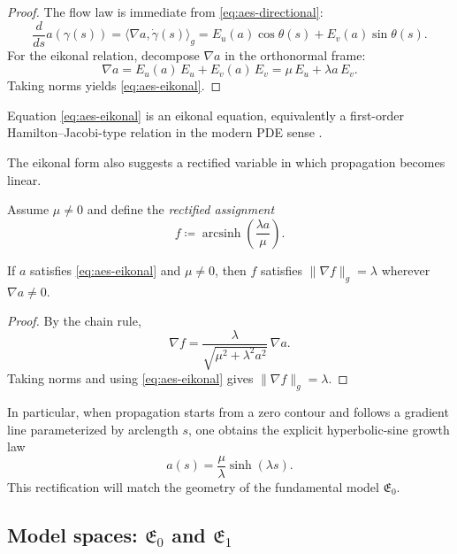 \begin{proof}
The flow law is immediate from \eqref{eq:aes-directional}:
\[
\frac{d}{ds}a(\gamma(s))=\langle \nabla a,\dot\gamma(s)\rangle_g=E_u(a)\cos\theta(s)+E_v(a)\sin\theta(s).
\]
For the eikonal relation, decompose $\nabla a$ in the orthonormal frame:
\[
\nabla a=E_u(a)\,E_u+E_v(a)\,E_v=\mu\,E_u+\lambda a\,E_v.
\]
Taking norms yields \eqref{eq:aes-eikonal}.
\end{proof}

Equation \eqref{eq:aes-eikonal} is an eikonal equation, equivalently a first-order Hamilton--Jacobi-type relation in the modern PDE sense \cite{Hamilton1834GeneralMethod,Evans2010PDE}.

The eikonal form also suggests a rectified variable in which propagation becomes linear.

\begin{definition}\label{def:aes-rectification}
Assume $\mu\neq 0$ and define the \emph{rectified assignment}
\[
f \coloneqq \operatorname{arcsinh}\!\left(\frac{\lambda a}{\mu}\right).
\]
\end{definition}

\begin{lemma}\label{lemma:aes-rectified-gradient}
If $a$ satisfies \eqref{eq:aes-eikonal} and $\mu\neq 0$, then $f$ satisfies $\|\nabla f\|_g=\lambda$ wherever $\nabla a\neq 0$.
\end{lemma}

\begin{proof}
By the chain rule,
\[
\nabla f=\frac{\lambda}{\sqrt{\mu^2+\lambda^2 a^2}}\,\nabla a.
\]
Taking norms and using \eqref{eq:aes-eikonal} gives $\|\nabla f\|_g=\lambda$.
\end{proof}

In particular, when propagation starts from a zero contour and follows a gradient line parameterized by arclength $s$, one obtains the explicit hyperbolic-sine growth law
\begin{equation}\label{eq:aes-hyperbolic-sine}
a(s)=\frac{\mu}{\lambda}\sinh(\lambda s).
\end{equation}
This rectification will match the geometry of the fundamental model $\mathfrak{E}_0$.

\subsection{Model spaces: \texorpdfstring{$\mathfrak{E}_0$}{E0} and \texorpdfstring{$\mathfrak{E}_1$}{E1}}\label{subsec:aes-models}

